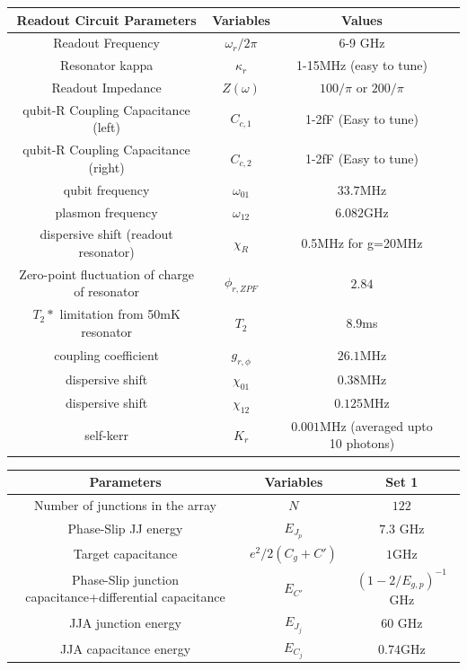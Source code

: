\documentclass[%
reprint,
superscriptaddress,
 amsmath,amssymb,
 aps,
 prx,
longbibliography,
floatfix,
]{revtex4-2}
\begin{document}
\begin{table}[htb]
\begin{center}
\begin{tabular}{|c |c| c |c| }
 \hline
 \textbf{Readout Circuit Parameters} & \textbf{Variables} & \textbf{Values}\\ 
\hline
Readout Frequency&$\omega_r/2\pi$ &6-9 GHz\\
 \hline
 Resonator kappa&$\kappa_r$ &1-15MHz (easy to tune)\\
 \hline
Readout Impedance & $Z(\omega)$ & $100/\pi$ or $200/\pi$\\
 \hline
 qubit-R Coupling Capacitance (left) &$C_{c,1}$ &1-2fF (Easy to tune)\\
 \hline
 qubit-R Coupling Capacitance (right) &$C_{c,2}$ &1-2fF (Easy to tune)\\
 \hline
qubit frequency &$\omega_{01}$&$33.7$MHz\\ 
 \hline
plasmon frequency &$\omega_{12}$&$6.082$GHz\\ 
 \hline
dispersive shift (readout resonator) &$\chi_{R}$&0.5MHz for g=20MHz\\ 
 \hline
Zero-point fluctuation of charge of resonator &$\phi_{r,ZPF}$&$2.84$\\
 \hline
$T_2*$ limitation from 50mK resonator &$T_2$&$8.9$ms\\
 \hline
coupling coefficient &$g_{r,\phi}$&$26.1$MHz\\
 \hline
dispersive shift &$\chi_{01}$&$0.38$MHz\\
 \hline
dispersive shift &$\chi_{12}$&$0.125$MHz\\
 \hline
self-kerr &$K_r$&$0.001$MHz (averaged upto 10 photons)\\
 \hline
 \end{tabular}
\end{center}
\begin{center}
\begin{tabular}{|c |c |c|}
 \hline
\textbf{Parameters}&\textbf{Variables} &Set 1\\ 
 \hline
Number of junctions in the array&$N$ &$122$\\ 
 \hline
Phase-Slip JJ energy&$E_{J_p}$ &$7.3$ GHz\\ 
\hline
Target capacitance&$e^2/2(C_g+C')$ &$1$GHz\\ 
\hline
Phase-Slip junction capacitance+differential capacitance &$E_{C'}$ &$(1-2/E_{g,p})^{-1}$GHz\\ 
\hline
JJA junction energy&$E_{J_j}$&60 GHz\\ 
\hline
JJA capacitance energy&$E_{C_j}$&$0.74$GHz\\ 

\end{tabular}
\end{center}
\end{table}
\end{document}

